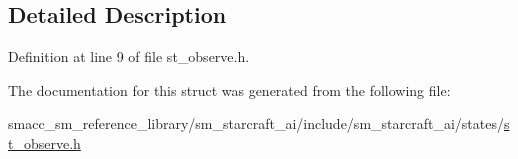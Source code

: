 \subsection{Detailed Description}


Definition at line 9 of file st\+\_\+observe.\+h.



The documentation for this struct was generated from the following file\+:\begin{DoxyCompactItemize}
\item 
smacc\+\_\+sm\+\_\+reference\+\_\+library/sm\+\_\+starcraft\+\_\+ai/include/sm\+\_\+starcraft\+\_\+ai/states/\hyperlink{sm__starcraft__ai_2include_2sm__starcraft__ai_2states_2st__observe_8h}{st\+\_\+observe.\+h}\end{DoxyCompactItemize}
